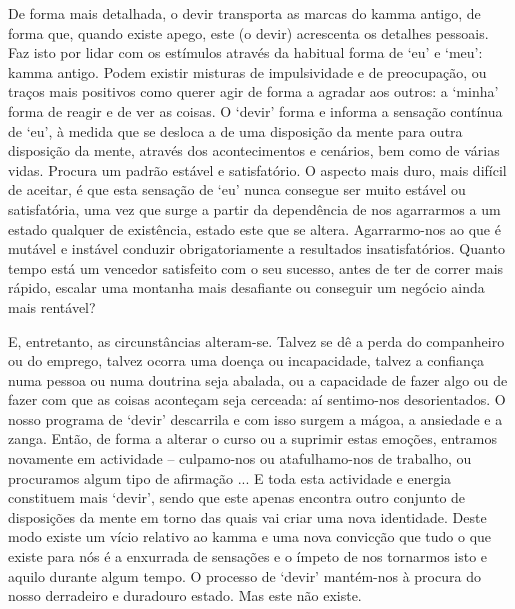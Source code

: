 De forma mais detalhada, o devir transporta as marcas do kamma antigo, de forma que, quando existe apego, este (o devir) acrescenta os detalhes pessoais. Faz isto por lidar com os estímulos através da habitual forma de `eu' e `meu': kamma antigo. Podem existir misturas de impulsividade e de preocupação, ou traços mais positivos como querer agir de forma a agradar aos outros: a `minha' forma de reagir e de ver as coisas. O `devir' forma e informa a sensação contínua de `eu', à medida que se desloca a de uma disposição da mente para outra disposição da mente, através dos acontecimentos e cenários, bem como de várias vidas. Procura um padrão estável e satisfatório. O aspecto mais duro, mais difícil de aceitar, é que esta sensação de `eu' nunca consegue ser muito estável ou satisfatória, uma vez que surge a partir da dependência de nos agarrarmos a um estado qualquer de existência, estado este que se altera. Agarrarmo-nos ao que é mutável e instável conduzir obrigatoriamente a resultados insatisfatórios. Quanto tempo está um vencedor satisfeito com o seu sucesso, antes de ter de correr mais rápido, escalar uma montanha mais desafiante ou conseguir um negócio ainda mais rentável?

E, entretanto, as circunstâncias alteram-se. Talvez se dê a perda do companheiro ou do emprego, talvez ocorra uma doença ou incapacidade, talvez a confiança numa pessoa ou numa doutrina seja abalada, ou a capacidade de fazer algo ou de fazer com que as coisas aconteçam seja cerceada: aí sentimo-nos desorientados. O nosso programa de `devir' descarrila e com isso surgem a mágoa, a ansiedade e a zanga. Então, de forma a alterar o curso ou a suprimir estas emoções, entramos novamente em actividade -- culpamo-nos ou atafulhamo-nos de trabalho, ou procuramos algum tipo de afirmação ... E toda esta actividade e energia constituem mais `devir', sendo que este apenas encontra outro conjunto de disposições da mente em torno das quais vai criar uma nova identidade. Deste modo existe um vício relativo ao kamma e uma nova convicção que tudo o que existe para nós é a enxurrada de sensações e o ímpeto de nos tornarmos isto e aquilo durante algum tempo. O processo de `devir' mantém-nos à procura do nosso derradeiro e duradouro estado. Mas este não existe.

